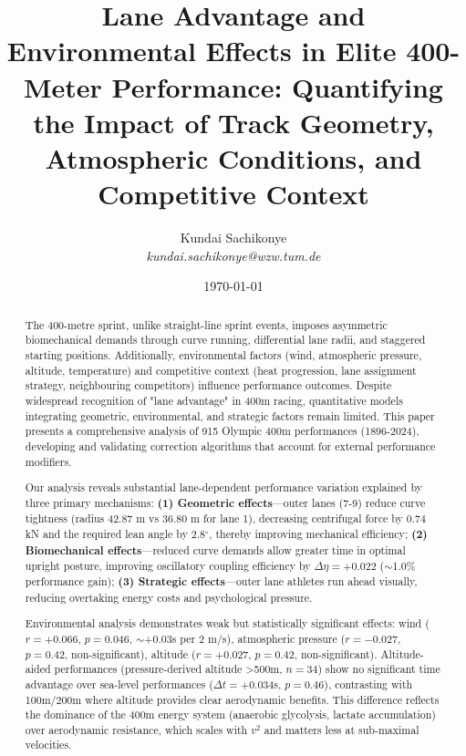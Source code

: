 \documentclass[12pt]{article}
\title{\textbf{Lane Advantage and Environmental Effects in Elite 400-Meter Performance: Quantifying the Impact of Track Geometry, Atmospheric Conditions, and Competitive Context}}
\author{
Kundai Sachikonye\\
\textit{kundai.sachikonye@wzw.tum.de}
}
\date{\today}
\begin{document}
\maketitle

\begin{abstract}
The 400-metre sprint, unlike straight-line sprint events, imposes asymmetric biomechanical demands through curve running, differential lane radii, and staggered starting positions. Additionally, environmental factors (wind, atmospheric pressure, altitude, temperature) and competitive context (heat progression, lane assignment strategy, neighbouring competitors) influence performance outcomes. Despite widespread recognition of "lane advantage" in 400m racing, quantitative models integrating geometric, environmental, and strategic factors remain limited. This paper presents a comprehensive analysis of 915 Olympic 400m performances (1896-2024), developing and validating correction algorithms that account for external performance modifiers.

Our analysis reveals substantial lane-dependent performance variation explained by three primary mechanisms: \textbf{(1) Geometric effects}—outer lanes (7-9) reduce curve tightness (radius 42.87 m vs 36.80 m for lane 1), decreasing centrifugal force by 0.74 kN and the required lean angle by 2.8$^\circ$, thereby improving mechanical efficiency; \textbf{(2) Biomechanical effects}—reduced curve demands allow greater time in optimal upright posture, improving oscillatory coupling efficiency by $\Delta \eta = +0.022$ ($\sim$1.0\% performance gain); \textbf{(3) Strategic effects}—outer lane athletes run ahead visually, reducing overtaking energy costs and psychological pressure.

Environmental analysis demonstrates weak but statistically significant effects: wind ($r = +0.066$, $p = 0.046$, $\sim$+0.03s per 2 m/s), atmospheric pressure ($r = -0.027$, $p = 0.42$, non-significant), altitude ($r = +0.027$, $p = 0.42$, non-significant). Altitude-aided performances (pressure-derived altitude >500m, $n=34$) show no significant time advantage over sea-level performances ($\Delta t = +0.034$s, $p = 0.46$), contrasting with 100m/200m where altitude provides clear aerodynamic benefits. This difference reflects the dominance of the 400m energy system (anaerobic glycolysis, lactate accumulation) over aerodynamic resistance, which scales with $v^2$ and matters less at sub-maximal velocities.


\end{abstract}
\end{document}
